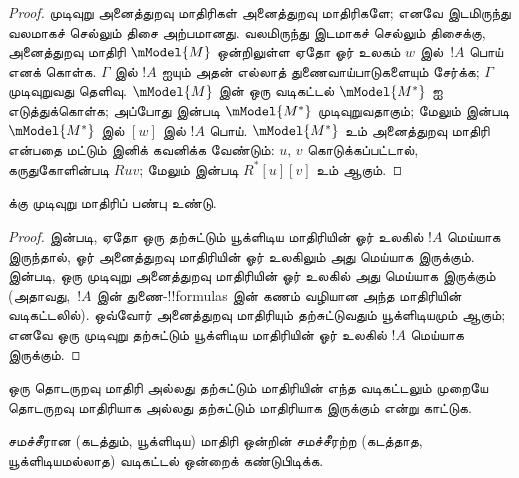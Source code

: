 \documentclass[../../../include/open-logic-section]{subfiles}
\begin{document}
\begin{proof}
  முடிவுறு அனைத்துறவு மாதிரிகள் அனைத்துறவு மாதிரிகளே; எனவே இடமிருந்து
  வலமாகச் செல்லும் திசை அற்பமானது. வலமிருந்து இடமாகச் செல்லும் திசைக்கு,
  அனைத்துறவு மாதிரி $\mModel{M}$ ஒன்றிலுள்ள ஏதோ ஓர் உலகம் $w$ இல்~$!A$
  பொய் எனக் கொள்க. $\Gamma$ இல் $!A$ ஐயும் அதன் எல்லாத் துணைவாய்பாடுகளையும்
  சேர்க்க; $\Gamma$ முடிவுறுவது தெளிவு. $\mModel{M}$ இன் ஒரு வடிகட்டல்
  $\mModel{M^*}$ ஐ எடுத்துக்கொள்க; அப்போது
   இன்படி $\mModel{M^*}$ முடிவுறுவதாகும்;
  மேலும்  இன்படி $\mModel{M^*}$ இல் $[w]$ இல்
  $!A$ பொய். $\mModel{M^*}$ உம் அனைத்துறவு மாதிரி என்பதை மட்டும் இனிக்
  கவனிக்க வேண்டும்: $u$, $v$ கொடுக்கப்பட்டால், கருதுகோளின்படி $Ruv$;
  மேலும் 
  இன்படி $R^*[u][v]$ உம் ஆகும்.
\end{proof}

\begin{cor}
   க்கு முடிவுறு மாதிரிப் பண்பு உண்டு.
\end{cor}

\begin{proof}
   இன்படி, ஏதோ ஒரு தற்சுட்டும் யூக்ளிடிய
  மாதிரியின் ஓர் உலகில் $!A$ மெய்யாக இருந்தால், ஓர் அனைத்துறவு மாதிரியின்
  ஓர் உலகிலும் அது மெய்யாக இருக்கும்.  இன்படி, ஒரு
  முடிவுறு அனைத்துறவு மாதிரியின் ஓர் உலகில் அது மெய்யாக இருக்கும்
  (அதாவது,~$!A$ இன் துணை-!!{formula}s இன் கணம் வழியான அந்த மாதிரியின்
  வடிகட்டலில்). ஒவ்வோர் அனைத்துறவு மாதிரியும் தற்சுட்டுவதும் யூக்ளிடியமும்
  ஆகும்; எனவே ஒரு முடிவுறு தற்சுட்டும் யூக்ளிடிய மாதிரியின் ஓர் உலகில்
  $!A$ மெய்யாக இருக்கும்.
\end{proof}

\begin{prob}
  ஒரு தொடருறவு மாதிரி அல்லது தற்சுட்டும் மாதிரியின் எந்த வடிகட்டலும்
  முறையே தொடருறவு மாதிரியாக அல்லது தற்சுட்டும் மாதிரியாக இருக்கும் என்று
  காட்டுக.
\end{prob}

\begin{prob}
  சமச்சீரான (கடத்தும், யூக்ளிடிய) மாதிரி ஒன்றின் சமச்சீரற்ற (கடத்தாத,
  யூக்ளிடியமல்லாத) வடிகட்டல் ஒன்றைக் கண்டுபிடிக்க.
\end{prob}
\end{document}
